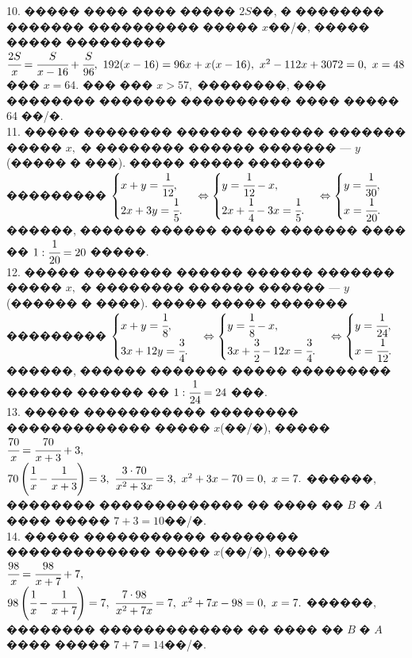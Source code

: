 \documentclass[12pt]{article}
\begin{document}
10. ����� ���� ���� ����� $2S$��, � �������� ������� ���������� ����� $x$��/�, ����� ����� ��������� $\cfrac{2S}{x}=\cfrac{S}{x-16}+\cfrac{S}{96},\
192(x-16)=96x+x(x-16),\ x^2-112x+3072=0,\ x=48$ ��� $x=64.$ ��� ��� $x>57,$ ��������, ��� �������� ������� ���������� ���� ����� 64 ��/�.\\
11. ����� �������� ������ ������� ������� ����� $x,$ � �������� ������ ������� --- $y$ (����� � ���). ����� ����� ������� ���������
$\begin{cases} x+y=\cfrac{1}{12},\\ 2x+3y=\cfrac{1}{5}.\end{cases}
\Leftrightarrow \begin{cases} y=\cfrac{1}{12}-x,\\ 2x+\cfrac{1}{4}-3x=\cfrac{1}{5}.\end{cases}
\Leftrightarrow \begin{cases} y=\cfrac{1}{30},\\ x=\cfrac{1}{20}.\end{cases}$
������, ������ ������ ����� ������� ���� �� $1:\cfrac{1}{20}=20$ �����.\\
12. ����� �������� ������ ������ ������� ����� $x,$ � �������� ������ ������ --- $y$ (������ � ����). ����� ����� ������� ���������
$\begin{cases} x+y=\cfrac{1}{8},\\ 3x+12y=\cfrac{3}{4}.\end{cases}
\Leftrightarrow \begin{cases} y=\cfrac{1}{8}-x,\\ 3x+\cfrac{3}{2}-12x=\cfrac{3}{4}.\end{cases}
\Leftrightarrow \begin{cases} y=\cfrac{1}{24},\\ x=\cfrac{1}{12}.\end{cases}$
������, ������ ������� ����� ��������� ������ ������ �� $1:\cfrac{1}{24}=24$ ���.\\
13. ����� ����������� �������� ������������� ����� $x$(��/�), ����� $\cfrac{70}{x}=\cfrac{70}{x+3}+3,$\\$
70\left(\cfrac{1}{x}-\cfrac{1}{x+3}\right)=3,\ \cfrac{3\cdot70}{x^2+3x}=3,\ x^2+3x-70=0,\ x=7.$ ������, �������� ������������� �� ���� �� $B$ � $A$ ���� ����� $7+3=10$��/�.\\
14. ����� ����������� �������� ������������� ����� $x$(��/�), ����� $\cfrac{98}{x}=\cfrac{98}{x+7}+7,$\\$
98\left(\cfrac{1}{x}-\cfrac{1}{x+7}\right)=7,\ \cfrac{7\cdot98}{x^2+7x}=7,\ x^2+7x-98=0,\ x=7.$ ������, �������� ������������� �� ���� �� $B$ � $A$ ���� ����� $7+7=14$��/�.\\
\end{document}
